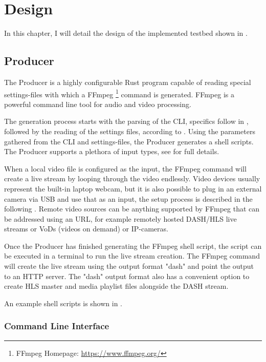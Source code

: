 \chapter{Design\label{cha:chapter4}}

In this chapter, I will detail the design of the implemented testbed shown in . 

\section{Producer\label{sec:producer}}

The Producer is a highly configurable Rust program capable of reading special settings-files with which a FFmpeg \footnote{FFmpeg Homepage: \url{https://www.ffmpeg.org/}} command is generated. FFmpeg is a powerful command line tool for audio and video processing.

The generation process starts with the parsing of the CLI, specifics follow in , followed by the reading of the settings files, according to . Using the parameters gathered from the CLI and settings-files, the Producer generates a shell scripts. The Producer supports a plethora of input types, see  for full details. 

When a local video file is configured as the input, the FFmpeg command will create a live stream by looping through the video endlessly. Video devices usually represent the built-in laptop webcam, but it is also possible to plug in an external camera via USB and use that as an input, the setup process is described in the following . Remote video sources can be anything supported by FFmpeg that can be addressed using an URL, for example remotely hosted DASH/HLS live streams or VoDs (videos on demand) or IP-cameras.

Once the Producer has finished generating the FFmpeg shell script, the script can be executed in a terminal to run the live stream creation. The FFmpeg command will create the live stream using the output format "dash" and point the output to an HTTP server. The "dash" output format also has a convenient option to create HLS master and media playlist files alongside the DASH stream. 

An example shell scripts is shown in .

\subsection{Command Line Interface\label{sec:cli_producer}}

